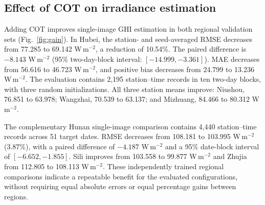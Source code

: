 \documentclass[11pt]{article}
\begin{document}
\subsection{Effect of COT on irradiance estimation}
Adding COT improves single-image GHI estimation in both regional validation sets (Fig.~\ref{fig:gain}). In Hubei, the station- and seed-averaged RMSE decreases from 77.285 to 69.142 W\,m$^{-2}$, a reduction of 10.54\%. The paired difference is $-8.143$ W\,m$^{-2}$ (95\% two-day-block interval: $[-14.999,-3.361]$). MAE decreases from 56.616 to 46.723 W\,m$^{-2}$, and positive bias decreases from 24.799 to 13.236 W\,m$^{-2}$. The evaluation contains 2,195 station--time records in ten two-day blocks, with three random initializations. All three station means improve: Niushou, 76.851 to 63.978; Wangzhai, 70.539 to 63.137; and Mizhuang, 84.466 to 80.312 W\,m$^{-2}$.

The complementary Hunan single-image comparison contains 4,440 station--time records across 51 target dates. RMSE decreases from 108.181 to 103.995 W\,m$^{-2}$ (3.87\%), with a paired difference of $-4.187$ W\,m$^{-2}$ and a 95\% date-block interval of $[-6.652,-1.855]$. Sili improves from 103.558 to 99.877 W\,m$^{-2}$ and Zhujia from 112.805 to 108.113 W\,m$^{-2}$. These independently trained regional comparisons indicate a repeatable benefit for the evaluated configurations, without requiring equal absolute errors or equal percentage gains between regions.
\end{document}
